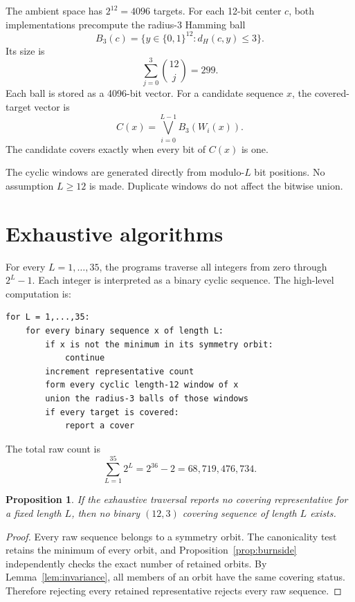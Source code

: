 \documentclass[11pt]{article}
\newtheorem{proposition}{Proposition}
\begin{document}
The ambient space has \(2^{12}=4096\) targets. For each 12-bit center
\(c\), both implementations precompute the radius-3 Hamming ball
\[
  B_3(c)=\{y\in\{0,1\}^{12}:d_H(c,y)\leq 3\}.
\]
Its size is
\[
  \sum_{j=0}^{3}\binom{12}{j}=299.
\]
Each ball is stored as a 4096-bit vector. For a candidate sequence \(x\), the
covered-target vector is
\[
  C(x)=\bigvee_{i=0}^{L-1} B_3(W_i(x)).
\]
The candidate covers exactly when every bit of \(C(x)\) is one.

The cyclic windows are generated directly from modulo-\(L\) bit positions.
No assumption \(L\geq 12\) is made. Duplicate windows do not affect the
bitwise union.

\section{Exhaustive algorithms}

For every \(L=1,\ldots,35\), the programs traverse all integers from zero
through \(2^L-1\). Each integer is interpreted as a binary cyclic sequence.
The high-level computation is:

\begin{verbatim}
for L = 1,...,35:
    for every binary sequence x of length L:
        if x is not the minimum in its symmetry orbit:
            continue
        increment representative count
        form every cyclic length-12 window of x
        union the radius-3 balls of those windows
        if every target is covered:
            report a cover
\end{verbatim}

The total raw count is
\[
  \sum_{L=1}^{35}2^L=2^{36}-2
  =68{,}719{,}476{,}734.
\]

\begin{proposition}\label{prop:completeness}
If the exhaustive traversal reports no covering representative for a fixed
length \(L\), then no binary \((12,3)\) covering sequence of length \(L\)
exists.
\end{proposition}

\begin{proof}
Every raw sequence belongs to a symmetry orbit. The canonicality test retains
the minimum of every orbit, and Proposition~\ref{prop:burnside} independently
checks the exact number of retained orbits. By Lemma~\ref{lem:invariance}, all
members of an orbit have the same covering status. Therefore rejecting every
retained representative rejects every raw sequence.
\end{proof}
\end{document}
